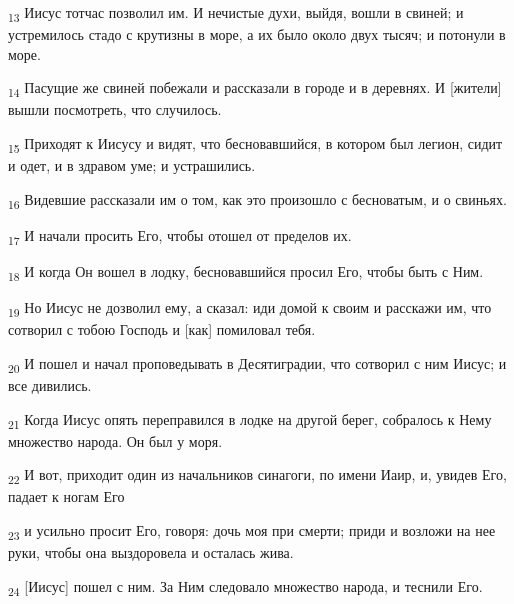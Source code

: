 \begin{tcolorbox}
\textsubscript{13} Иисус тотчас позволил им. И нечистые духи, выйдя, вошли в свиней; и устремилось стадо с крутизны в море, а их было около двух тысяч; и потонули в море.
\end{tcolorbox}
\begin{tcolorbox}
\textsubscript{14} Пасущие же свиней побежали и рассказали в городе и в деревнях. И [жители] вышли посмотреть, что случилось.
\end{tcolorbox}
\begin{tcolorbox}
\textsubscript{15} Приходят к Иисусу и видят, что бесновавшийся, в котором был легион, сидит и одет, и в здравом уме; и устрашились.
\end{tcolorbox}
\begin{tcolorbox}
\textsubscript{16} Видевшие рассказали им о том, как это произошло с бесноватым, и о свиньях.
\end{tcolorbox}
\begin{tcolorbox}
\textsubscript{17} И начали просить Его, чтобы отошел от пределов их.
\end{tcolorbox}
\begin{tcolorbox}
\textsubscript{18} И когда Он вошел в лодку, бесновавшийся просил Его, чтобы быть с Ним.
\end{tcolorbox}
\begin{tcolorbox}
\textsubscript{19} Но Иисус не дозволил ему, а сказал: иди домой к своим и расскажи им, что сотворил с тобою Господь и [как] помиловал тебя.
\end{tcolorbox}
\begin{tcolorbox}
\textsubscript{20} И пошел и начал проповедывать в Десятиградии, что сотворил с ним Иисус; и все дивились.
\end{tcolorbox}
\begin{tcolorbox}
\textsubscript{21} Когда Иисус опять переправился в лодке на другой берег, собралось к Нему множество народа. Он был у моря.
\end{tcolorbox}
\begin{tcolorbox}
\textsubscript{22} И вот, приходит один из начальников синагоги, по имени Иаир, и, увидев Его, падает к ногам Его
\end{tcolorbox}
\begin{tcolorbox}
\textsubscript{23} и усильно просит Его, говоря: дочь моя при смерти; приди и возложи на нее руки, чтобы она выздоровела и осталась жива.
\end{tcolorbox}
\begin{tcolorbox}
\textsubscript{24} [Иисус] пошел с ним. За Ним следовало множество народа, и теснили Его.
\end{tcolorbox}

